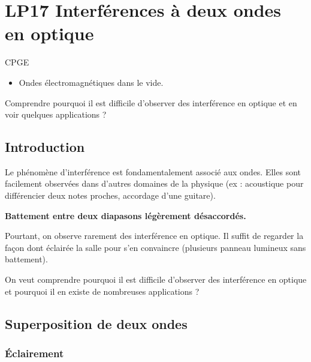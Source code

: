 \section{LP17 Interférences à deux ondes en optique}

\niveau CPGE

\prerequis
\begin{itemize}
\item Ondes électromagnétiques dans le vide.
\end{itemize}

\objectif
Comprendre pourquoi il est difficile d'observer des interférence en optique et en voir quelques applications ?

\footnotesize{}
\cite{*}

\subsection{Introduction}

Le phénomène d'interférence est fondamentalement associé aux ondes.
Elles sont facilement observées dans d'autres domaines de la physique (ex : acoustique pour différencier deux notes proches, accordage d'une guitare).

\begin{experience}
\textbf{Battement entre deux diapasons légèrement désaccordés.}
\end{experience}

Pourtant, on observe rarement des interférence en optique.
Il suffit de regarder la façon dont éclairée la salle pour s'en convaincre (plusieurs panneau lumineux sans battement).

\begin{transition}
On veut comprendre pourquoi il est difficile d'observer des interférence en optique et pourquoi il en existe de nombreuses applications ?
\end{transition}

\subsection{Superposition de deux ondes}

\subsubsection{Éclairement}

